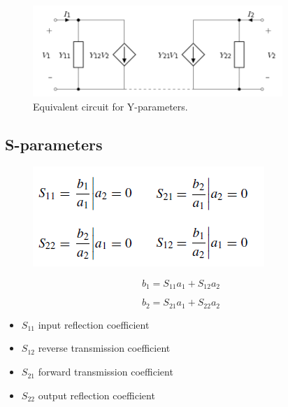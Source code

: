 \begin{figure} [H]
	\centering
	\includegraphics[width=0.6\linewidth]{graphics/38.png}
	\caption{Equivalent circuit for Y-parameters.}
	\label{fig:38}
\end{figure}

\subsection{S-parameters}
\begin{figure} [H]
	\centering
	\includegraphics[width=0.5\linewidth]{graphics/40.png}
\end{figure}

\begin{equation}
b_1 = S_{11} a_1 + S_{12} a_2
\end{equation}

\begin{equation}
b_2 = S_{21} a_1 + S_{22} a_2
\end{equation}

\begin{itemize}
	\item $S_{11}$ input reflection coefficient
	\item $S_{12}$ reverse transmission coefficient
	\item $S_{21}$ forward transmission coefficient
	\item $S_{22}$ output reflection coefficient
\end{itemize}




